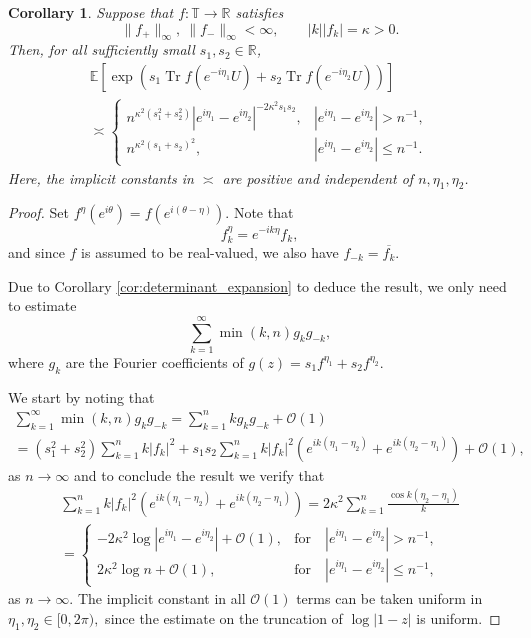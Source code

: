 \documentclass[11pt]{amsart}
\theoremstyle{plain}
\newtheorem{corollary}[theorem]{Corollary}
\theoremstyle{remark}
\numberwithin{equation}{section}
\begin{document}
\begin{corollary}\label{cor:mixed_exponential_moments}
    Suppose that \(f:\mathbb T\to\mathbb R\) satisfies
\[ 
\|f_+\|_\infty,\ \|f_-\|_\infty<\infty,
\qquad
|k||f_k|=\kappa>0.
\]
Then, for all sufficiently small \(s_1,s_2\in\mathbb R\),
\begin{multline}
\mathbb E\left[
\exp\left(
s_1\operatorname{Tr} f(e^{-i\eta_1}U)
+s_2\operatorname{Tr} f(e^{-i\eta_2}U)
\right)
\right]\\
\asymp
\begin{cases}
n^{\kappa^2(s_1^2+s_2^2)}
|e^{i\eta_1}-e^{i\eta_2}|^{-2\kappa^2s_1s_2},
&
|e^{i\eta_1}-e^{i\eta_2}|>n^{-1},
\\[4pt]
n^{\kappa^2(s_1+s_2)^2},
&
|e^{i\eta_1}-e^{i\eta_2}|\le n^{-1}.
\end{cases}
\end{multline}
Here, the implicit constants in \(\asymp\) are positive and independent of
\(n,\eta_1,\eta_2\).
\end{corollary}
\begin{proof}
 Set $f^\eta(e^{i \theta})=f(e^{i(\theta-\eta)})$. Note that 
    $$
    f^\eta_k=e^{-ik \eta} f_k,
    $$
    and since $f$ is assumed to be real-valued, we also have $f_{-k}=\overline{f_{k}}$.
    
     Due to Corollary \ref{cor:determinant_expansion} to deduce the result, we only need to estimate
     $$
     \sum_{k=1}^\infty \min (k,n) g_k g_{-k},$$
     where $g_k$ are the Fourier coefficients of $g(z)=s_1 f^{\eta_1}+s_2 f^{\eta_2}. $
     
   
    
    We start by noting that
    \begin{multline}
    \sum_{k=1}^\infty \min(k,n) g_k g_{-k}= \sum_{k=1}^n kg_k g_{-k}+ \mathcal O(1)
    \\=(s_1^2+s_2^2)\sum_{k=1}^{n}k|f_k|^2+ s_1s_2\sum_{k=1}^n k|f_k|^2(e^{ik(\eta_1-\eta_2)}+e^{ik(\eta_2-\eta_1)})+\mathcal{O}(1),
    \end{multline}
    as $n\to \infty$
    and to conclude the result we verify that
    \begin{multline}
    \sum_{k=1}^n k|f_k|^2(e^{ik(\eta_1-\eta_2)} + e^{ik(\eta_2-\eta_1)})
    = 2\kappa^2
    \sum_{k=1}^{n}
    \frac{\cos k(\eta_2-\eta_1)}{k}
    \\
    =\begin{cases}
     -2\kappa^2 \log|e^{i \eta_1}-e^{i \eta_2}|+\mathcal{O}(1), &\text{for}\quad |e^{i \eta_1}-e^{i \eta_2}|> n^{-1},
     \\  2\kappa^2 \log n+ \mathcal{O}(1), & \text{for}\quad |e^{i \eta_1}-e^{i \eta_2}|\leq n^{-1}, \end{cases}
    \end{multline}
    as $n\to  \infty$. The implicit constant in all $\mathcal O(1)$ terms can be taken uniform in $\eta_1,\eta_2\in [0,2 \pi),$ since the estimate on the truncation of $\log|1-z|$ is uniform.
\end{proof}
\end{document}
